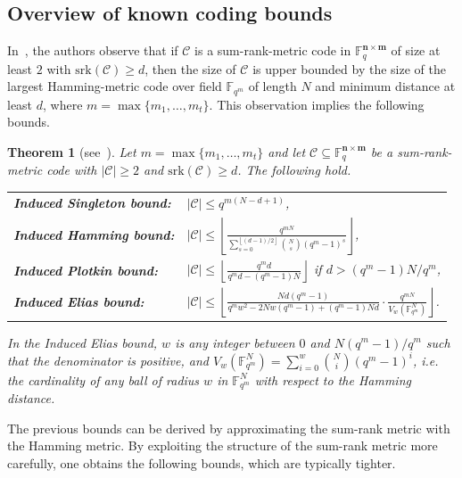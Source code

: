 \documentclass[a4paper]{article}
\newtheorem{theorem}[formula]{Theorem}
\newcommand{\F}{\mathbb{F}}
\newcommand{\bfn}{\mathbf {n}}
\newcommand{\bfm}{\mathbf {m}}
\newcommand{\spac}{\F^{\bfn\times\bfm}_q}
\newcommand{\srk}{\mathrm{srk}}
\newcommand{\mC}{\mathcal{C}}
\newcommand{\floor}[1]{{\left\lfloor{#1}\right\rfloor}}
\begin{document}
\subsection{Overview of known coding bounds}\label{sec:code-bounds}

 
 


In~\cite{byrne2021fundamental}, the authors
observe that if $\mC$ is a sum-rank-metric code in $\spac$ of size at least $2$ with $\srk(\mC) \ge d$,
then the size of $\mC$ is upper bounded by the size of the largest Hamming-metric code over field $\F_{q^m}$ of length $N$ and minimum distance at least $d$, where
$m=\max\{m_1,\dots,m_t\}$.
This observation implies the following bounds.

\begin{theorem}[see~]\label{thm:induced} Let $m=\max\{m_1,\dots,m_t\}$ and let $\mC\subseteq\spac$ be a sum-rank-metric code with $|\mC|\geq 2$ and $\srk(\mC) \ge d$. The following hold.
\begin{center}
    \begin{tabular}{ll}
     \textbf{Induced Singleton bound:} & $|\mC|\leq q^{m(N-d+1)}$, \\[0.5cm]
     \textbf{Induced Hamming bound:} & $|\mC|\leq \floor{\frac{q^{mN}}{\sum_{s=0}^{\floor{(d-1)/2}}\binom{N}{s}(q^m-1)^s}}$, \\[0.5cm]
     \textbf{Induced Plotkin bound:} & $|\mC|\leq \floor{\frac{q^{m}d}{q^md-(q^m-1)N}}$ if $d>(q^m-1)N/q^m$, \\[0.5cm]
     \textbf{Induced Elias bound:} & $|\mC|\leq \floor{\frac{Nd(q^m-1)}{q^mw^2-2Nw(q^m-1)+(q^m-1)Nd}\cdot\frac{q^{mN}}{V_w(\F^N_{q^m})}}$. \\[0.5cm]
\end{tabular}
\end{center}
In the Induced Elias bound, $w$ is any integer between $0$ and $N(q^m-1)/q^m$ such that the denominator is positive, and $V_w(\F_{q^m}^N)=\sum_{i=0}^w {N\choose i}(q^m-1)^i$, i.e. the cardinality of any ball of radius $w$ in $\F_{q^m}^N$ with respect to the Hamming distance.
\end{theorem}


The previous bounds can be derived by approximating the sum-rank metric with the Hamming metric. By exploiting the structure of the sum-rank metric more carefully, one obtains the following bounds, which are typically tighter.
\end{document}
